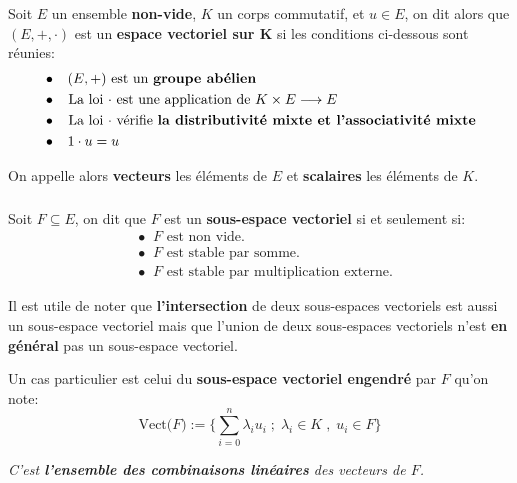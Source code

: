 \chapter*{} %

\subsection*{}
Soit \(E\) un ensemble \textbf{non-vide}, \(K\) un corps commutatif, et \(u \in E\), on dit alors que \((E, +, \cdot)\) est un \textbf{espace vectoriel sur K} si les conditions ci-dessous sont réunies:
\begin{align*}
   &\bullet \;\;\; (E, +) \text{ est un \textbf{groupe abélien}} \\
   &\bullet \;\; \text{ La loi \(\cdot\) est une application de \(K \times E \longrightarrow E\)} \\
   &\bullet \;\; \text{ La loi \(\cdot\) vérifie \textbf{la distributivité mixte et l'associativité mixte}} \\
   &\bullet \;\;\; 1 \cdot u = u
\end{align*}

On appelle alors \textbf{vecteurs} les éléments de \(E\) et \textbf{scalaires} les éléments de \(K\).

\subsection*{}
Soit \(F \subseteq E\), on dit que \(F\) est un \textbf{sous-espace vectoriel} si et seulement si:
\begin{align*}
   &\bullet \;\; F \text{ est non vide.} \\
   &\bullet \;\; F \text{ est stable par somme.} \\
   &\bullet \;\; F \text{ est stable par multiplication externe.}
\end{align*}

Il est utile de noter que \textbf{l'intersection} de deux sous-espaces vectoriels est aussi un sous-espace vectoriel mais que l'union de deux sous-espaces vectoriels n'est \textbf{en général} pas un sous-espace vectoriel.\<

Un cas particulier est celui du \textbf{sous-espace vectoriel engendré} par \(F\) qu'on note:
\[
   \text{Vect(\(F\))} := \Biggl\{ \sum_{i=0}^{n} \lambda_i u_i\; ; \; \lambda_{i} \in K \; , \; u_{i} \in F \Biggl\}
\]
\begin{center}
    \textit{
        C'est \textbf{l'ensemble des combinaisons linéaires} des vecteurs de \(F\).
    }
\end{center}

